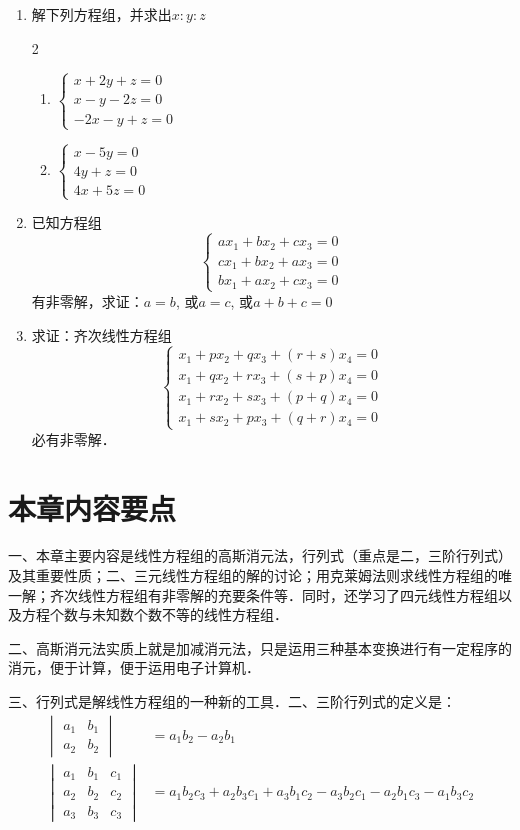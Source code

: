 \begin{enumerate}
\item 解下列方程组，并求出$x:y:z$
\begin{multicols}{2}
    \begin{enumerate}
\item $\begin{cases}
    x+2y+z=0\\x-y-2z=0\\-2x-y+z=0
\end{cases}$
\item $\begin{cases}
    x-5y=0\\
4y+z=0\\
4x+5z=0
\end{cases}$
    \end{enumerate}
\end{multicols}
\item 已知方程组
\[\begin{cases}
 ax_1+bx_2+cx_3=0 \\ cx_1+bx_2+ax_3=0 \\ bx_1 +ax_2+cx_3=0   
\end{cases}\]
有非零解，求证：$a=b$, 或$a=c$, 或$a+b+c=0$

\item 求证：齐次线性方程组
\[\begin{cases}
  x_1+px_2+qx_3+ (r+s) x_4=0\\
  x_1+qx_2+rx_3+ (s+p) x_4=0\\
  x_1+rx_2+sx_3+ (p+q) x_4=0\\
  x_1+sx_2+px_3+ (q+r) x_4=0 
\end{cases}\]
必有非零解．
\end{enumerate}

\section*{本章内容要点}
一、本章主要内容是线性方程组的高斯消元法，行列式（重点是二，三阶行列式）及其重要性质；二、三元线性方程组的解的讨论；用克莱姆法则求线性方程组的唯一解；齐次线性方程组有非零解的充要条件等．同时，还学习了四元线性方程组以及方程个数与未知数个数不等的线性方程组．

二、高斯消元法实质上就是加减消元法，只是运用三种基本变换进行有一定程序的消元，便于计算，便于运用电子计算机．

三、行列式是解线性方程组的一种新的工具．二、三阶行列式的定义是：
\[\begin{split}
\begin{vmatrix}
    a_1&b_1\\a_2&b_2
\end{vmatrix}&=a_1b_2-a_2b_1\\
\begin{vmatrix}
    a_1&b_1&c_1\\a_2&b_2&c_2\\a_3&b_3&c_3
\end{vmatrix}&=a_1b_2c_3+a_2b_3c_1+a_3b_1c_2
-a_3b_2c_1-a_2b_1c_3-a_1b_3c_2
\end{split}\]

